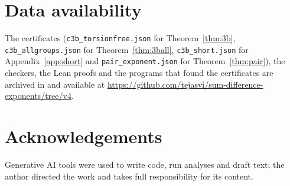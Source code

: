 \documentclass[11pt]{amsart}
\theoremstyle{definition}
\theoremstyle{remark}
\numberwithin{equation}{section}
\newcommand{\file}[1]{\texttt{#1}}
\newcommand{\RepoURL}{https://github.com/tejasvi/sum-difference-exponents/tree/v4}
\begin{document}
\section*{Data availability}
The certificates (\file{c3b\_torsionfree.json} for Theorem~\ref{thm:3b}, \file{c3b\_allgroups.json} for Theorem~\ref{thm:3ball}, \file{c3b\_short.json} for Appendix~\ref{app:short} and \file{pair\_exponent.json} for Theorem~\ref{thm:pair}), the checkers, the Lean proofs and the programs that found the certificates are archived in \cite{Cert} and available at \url{\RepoURL}.

\section*{Acknowledgements}
Generative AI tools were used to write code, run analyses and draft text; the author directed the work and takes full responsibility for its content.
\end{document}
